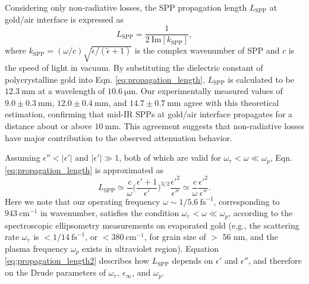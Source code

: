 \documentclass[aip,apl,reprint]{revtex4-1}
\begin{document}
Considering only non-radiative losses, the SPP propagation length $L_{\mathrm{SPP}}$ at gold/air interface is expressed as
\begin{equation}
 L_{\mathrm{SPP}} = \frac{1}{2\:\mathrm{Im}[k_{\mathrm{SPP}}]},
\label{eq:propagation_length}
\end{equation}
where $k_{\mathrm{SPP}}=(\omega/c)\sqrt{\tilde{\epsilon}/(\tilde{\epsilon}+1)}$ is the complex wavenumber of SPP and $c$ is the speed of light in vacuum. By substituting the dielectric constant of polycrystalline gold\cite{Palik} into Eqn. \ref{eq:propagation_length}, $L_{\mathrm{SPP}}$ is calculated to be $12.3\:\mathrm{mm}$ at a wavelength of $10.6\:\mathrm{\mu m}$.
Our experimentally measured values of $9.0\pm0.3\:\mathrm{mm}$, $12.0\pm0.4\:\mathrm{mm}$, and $14.7\pm0.7\:\mathrm{mm}$ agree with this theoretical estimation, confirming that mid-IR SPPs at gold/air interface propagates for a distance about or above $10\:\mathrm{mm}$. This agreement suggests that non-radiative losses have major contribution to the observed attenuation behavior.

Assuming $\epsilon'' < |\epsilon'|$ and $|\epsilon'| \gg 1$, both of which are valid for $\omega_{\mathrm{\tau}} < \omega \ll \omega_p$, Eqn. \ref{eq:propagation_length} is approximated as\cite{Raether}
\begin{equation}
L_{\mathrm{SPP}} \simeq \frac{c}{\omega} \biggl(\frac{\epsilon'+1}{\epsilon'}\biggr)^{3/2} \frac{\epsilon'^2}{\epsilon''} \simeq \frac{c}{\omega} \frac{\epsilon'^2}{\epsilon''}.
\label{eq:propagation_length2}
\end{equation}
Here we note that our operating frequency $\omega \sim 1/5.6 ~\mathrm{fs}^{-1}$, corresponding to $943 ~\mathrm{cm}^{-1}$ in wavenumber, satisfies the condition $\omega_{\mathrm{\tau}} < \omega \ll \omega_p$, according to the spectroscopic ellipsometry measurements on evaporated gold \cite{Olmon, Trollmann}  (e.g., the scattering rate $\omega_{\mathrm{\tau}}$ is $<1/14\:\mathrm{fs}^{-1}$, or  $<380\:\mathrm{cm}^{-1}$, for grain size of $>$ 56 nm\cite{Trollmann}, and the plasma frequency $\omega_p$ exists in ultraviolet region). Equation \ref{eq:propagation_length2} describes how $L_{\mathrm{SPP}}$ depends on $\epsilon'$ and $\epsilon''$, and therefore on the Drude parameters of $\omega_{\mathrm{\tau}}$, $\epsilon_{\infty}$, and $\omega_p$.
\end{document}
